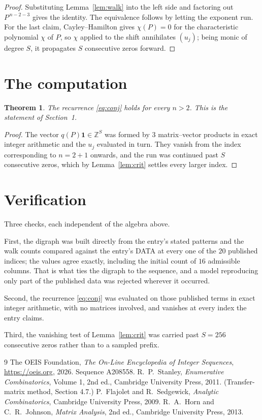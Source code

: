 \documentclass[11pt,a4paper]{article}
\theoremstyle{plain}
\newtheorem{theorem}{Theorem}
\theoremstyle{definition}
\begin{document}
\begin{proof}
Substituting Lemma~\ref{lem:walk} into the left side and factoring out
$P^{\,n-2-3}$ gives the identity. The equivalence follows by letting the exponent
run. For the last claim, Cayley--Hamilton gives $\chi(P)=0$ for the characteristic
polynomial $\chi$ of $P$, so $\chi$ applied to the shift annihilates $(u_j)$; being monic of
degree $S$, it propagates $S$ consecutive zeros forward.
\end{proof}

\section{The computation}

\begin{theorem}
The recurrence \eqref{eq:conj} holds for every $n>2$. This is the statement of
Section~1.
\end{theorem}

\begin{proof}
The vector $q(P)\mathbf{1}\in\mathbb{Z}^{S}$ was formed by $3$ matrix--vector
products in exact integer arithmetic and the $u_j$ evaluated in turn. They vanish from the
index corresponding to $n=2+1$ onwards, and the run was continued past $S$ consecutive
zeros, which by Lemma~\ref{lem:crit} settles every larger index.
\end{proof}

\section{Verification}

Three checks, each independent of the algebra above.

First, the digraph was built directly from the entry's stated patterns and the walk counts
compared against the entry's DATA at every one of the $20$ published indices; the
values agree exactly, including the initial count of $16$ admissible columns. That is
what ties the digraph to the sequence, and a model reproducing only part of the published
data was rejected wherever it occurred.

Second, the recurrence \eqref{eq:conj} was evaluated on those published terms in exact
integer arithmetic, with no matrices involved, and vanishes at every index the entry claims.

Third, the vanishing test of Lemma~\ref{lem:crit} was carried past $S=256$ consecutive
zeros rather than to a sampled prefix.

\begin{thebibliography}{9}
 The OEIS Foundation, \emph{The On-Line Encyclopedia of Integer
Sequences}, \url{https://oeis.org}, 2026. Sequence A208558.
 R.~P.~Stanley, \emph{Enumerative Combinatorics}, Volume 1, 2nd ed.,
Cambridge University Press, 2011. (Transfer-matrix method, Section 4.7.)
 P.~Flajolet and R.~Sedgewick, \emph{Analytic Combinatorics}, Cambridge
University Press, 2009.
 R.~A.~Horn and C.~R.~Johnson, \emph{Matrix Analysis}, 2nd ed., Cambridge
University Press, 2013.
\end{thebibliography}
\end{document}
